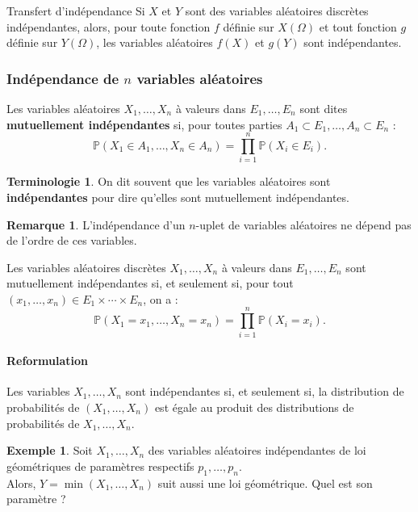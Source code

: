 \documentclass[french]{article}
\renewcommand{\P}{\mathbb{P}}
\theoremstyle{plain}
\theoremstyle{definition}
\newtheorem*{ex}{Exemple}
\newtheorem*{rmq}{Remarque}
\newtheorem*{terminologie}{Terminologie}
\theoremstyle{remark}
\begin{document}
\begin{thm}{Transfert d'indépendance}%
	Si $X$ et $Y$ sont des variables aléatoires discrètes indépendantes, alors, pour toute fonction $f$ définie sur $X(\Omega)$ et tout fonction $g$ définie sur $Y(\Omega)$, les variables aléatoires $f(X)$ et $g(Y)$ sont indépendantes.
\end{thm}

\subsubsection*{Indépendance de $n$ variables aléatoires}

\begin{dfn}
	Les variables aléatoires $X_1,\ldots,X_n$ à valeurs dans $E_1,\ldots,E_n$ sont dites \textbf{mutuellement indépendantes} si, pour toutes parties $A_1\subset E_1,\ldots,A_n\subset E_n$ : $$\P(X_1\in A_1,\ldots,X_n\in A_n)=\prod_{i=1}^{n}\P(X_i\in E_i).$$
\end{dfn}

\begin{terminologie}
	On dit souvent que les variables aléatoires sont \textbf{indépendantes} pour dire qu'elles sont mutuellement indépendantes.
\end{terminologie}

\begin{rmq}
	L'indépendance d'un $n$-uplet de variables aléatoires ne dépend pas de l'ordre de ces variables.
\end{rmq}

\begin{thm}{}%
	Les variables aléatoires discrètes $X_1,\ldots,X_n$ à valeurs dans $E_1,\ldots,E_n$ sont mutuellement indépendantes si, et seulement si, pour tout $(x_1,\ldots,x_n)\in E_1\times\cdots\times E_n$, on a :
	$$\P(X_1=x_1,\ldots,X_n=x_n)=\prod_{i=1}^{n}\P(X_i=x_i).$$
\end{thm}

\paragraph{Reformulation}
Les variables $X_1,\ldots,X_n$ sont indépendantes si, et seulement si, la distribution de probabilités de $(X_1,\ldots,X_n)$ est égale au produit des distributions de probabilités de $X_1,\ldots,X_n$.

\begin{ex}
	Soit $X_1,\ldots,X_n$ des variables aléatoires indépendantes de loi géométriques de paramètres respectifs $p_1,\ldots,p_n$.\\
	Alors, $Y=\min(X_1,\ldots,X_n)$ suit aussi une loi géométrique. Quel est son paramètre ?
\end{ex}
\end{document}
